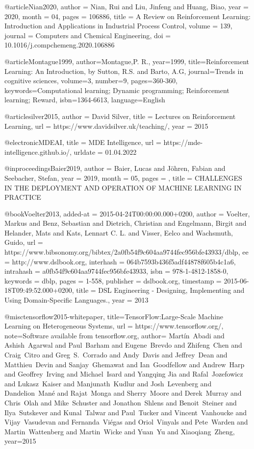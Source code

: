 @article{Nian2020,
author = {Nian, Rui and Liu, Jinfeng and Huang, Biao},
year = {2020},
month = {04},
pages = {106886},
title = {A Review on Reinforcement Learning: Introduction and Applications in Industrial Process Control},
volume = {139},
journal = {Computers and Chemical Engineering},
doi = {10.1016/j.compchemeng.2020.106886}
}

@article{Montague1999,
author={Montague,P. R.},
year={1999},
title={Reinforcement Learning: An Introduction, by Sutton, R.S. and Barto, A.G},
journal={Trends in cognitive sciences},
volume={3},
number={9},
pages={360-360},
keywords={Computational learning; Dynamic programming; Reinforcement learning; Reward},
isbn={1364-6613},
language={English}
}

@article{silver2015,
author = {David Silver},
title = {Lectures on Reinforcement Learning},
url = {https://www.davidsilver.uk/teaching/},
year = {2015}
}

@electronic{MDEAI,
 title = {MDE Intelligence},
 url = {https://mde-intelligence.github.io/},
 urldate = {01.04.2022}
}

@inproceedings{Baier2019,
author = {Baier, Lucas and Jöhren, Fabian and Seebacher, Stefan},
year = {2019},
month = {05},
pages = {},
title = {CHALLENGES IN THE DEPLOYMENT AND OPERATION OF MACHINE LEARNING IN PRACTICE}
}

@book{Voelter2013,
  added-at = {2015-04-24T00:00:00.000+0200},
  author = {Voelter, Markus and Benz, Sebastian and Dietrich, Christian and Engelmann, Birgit and Helander, Mats and Kats, Lennart C. L. and Visser, Eelco and Wachsmuth, Guido},
  url = {https://www.bibsonomy.org/bibtex/2a0fb54f9c604aa9744fec956bfe43933/dblp},
  ee = {http://www.dslbook.org},
  interhash = {064b7593b436f5adf44878f605b4c1a6},
  intrahash = {a0fb54f9c604aa9744fec956bfe43933},
  isbn = {978-1-4812-1858-0},
  keywords = {dblp},
  pages = {1-558},
  publisher = {dslbook.org},
  timestamp = {2015-06-18T09:49:52.000+0200},
  title = {DSL Engineering - Designing, Implementing and Using Domain-Specific Languages.},
  year = 2013
}

@misc{tensorflow2015-whitepaper,
title={{TensorFlow}:Large-Scale Machine Learning on Heterogeneous Systems},
url = {https://www.tensorflow.org/},
note={Software available from tensorflow.org},
author={
    Mart\'{i}n~Abadi and
    Ashish~Agarwal and
    Paul~Barham and
    Eugene~Brevdo and
    Zhifeng~Chen and
    Craig~Citro and
    Greg~S.~Corrado and
    Andy~Davis and
    Jeffrey~Dean and
    Matthieu~Devin and
    Sanjay~Ghemawat and
    Ian~Goodfellow and
    Andrew~Harp and
    Geoffrey~Irving and
    Michael~Isard and
    Yangqing Jia and
    Rafal~Jozefowicz and
    Lukasz~Kaiser and
    Manjunath~Kudlur and
    Josh~Levenberg and
    Dandelion~Man\'{e} and
    Rajat~Monga and
    Sherry~Moore and
    Derek~Murray and
    Chris~Olah and
    Mike~Schuster and
    Jonathon~Shlens and
    Benoit~Steiner and
    Ilya~Sutskever and
    Kunal~Talwar and
    Paul~Tucker and
    Vincent~Vanhoucke and
    Vijay~Vasudevan and
    Fernanda~Vi\'{e}gas and
    Oriol~Vinyals and
    Pete~Warden and
    Martin~Wattenberg and
    Martin~Wicke and
    Yuan~Yu and
    Xiaoqiang~Zheng},
  year={2015}
}

